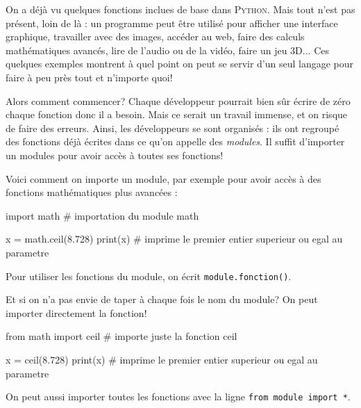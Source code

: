 On a déjà vu quelques fonctions inclues de base dans \textsc{Python}. Mais tout n'est pas présent, loin de là : un programme peut être utilisé pour afficher une interface graphique, travailler avec des images, accéder au web, faire des calculs mathématiques avancés, lire de l'audio ou de la vidéo, faire un jeu 3D... Ces quelques exemples montrent à quel point on peut se servir d'un seul langage pour faire à peu près tout et n'importe quoi!

Alors comment commencer? Chaque développeur pourrait bien sûr écrire de zéro chaque fonction donc il a besoin. Mais ce serait un travail immense, et on risque de faire des erreurs. Ainsi, les développeurs se sont organisés : ils ont regroupé des fonctions déjà écrites dans ce qu'on appelle des \textit{modules}. Il suffit d'importer un modules pour avoir accès à toutes ses fonctions!

Voici comment on importe un module, par exemple pour avoir accès à des fonctions mathématiques plus avancées :

\begin{python}
import math # importation du module math

x = math.ceil(8.728)
print(x) # imprime le premier entier superieur ou egal au parametre
\end{python}

Pour utiliser les fonctions du module, on écrit \lstinline{module.fonction()}.

Et si on n'a pas envie de taper à chaque fois le nom du module? On peut importer directement la fonction!

\begin{python}
from math import ceil # importe juste la fonction ceil

x = ceil(8.728)
print(x) # imprime le premier entier superieur ou egal au parametre
\end{python}

On peut aussi importer toutes les fonctions avec la ligne \lstinline{from module import *}.